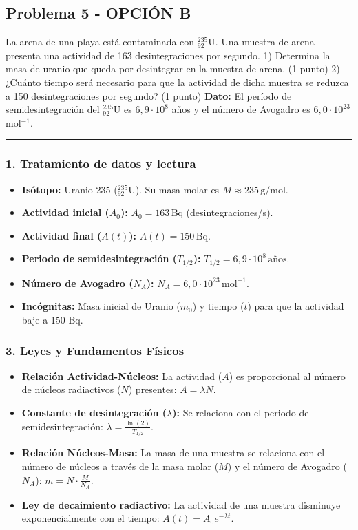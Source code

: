 \newpage

\subsection{Problema 5 - OPCIÓN B}
\label{subsec:5B_2009_sep_ext}

\begin{cajaenunciado}
La arena de una playa está contaminada con ${}_{92}^{235}\text{U}$. Una muestra de arena presenta una actividad de 163 desintegraciones por segundo.
1) Determina la masa de uranio que queda por desintegrar en la muestra de arena. (1 punto)
2) ¿Cuánto tiempo será necesario para que la actividad de dicha muestra se reduzca a 150 desintegraciones por segundo? (1 punto)
\textbf{Dato:} El período de semidesintegración del ${}_{92}^{235}\text{U}$ es $6,9\cdot10^8$ años y el número de Avogadro es $6,0\cdot10^{23}$ mol$^{-1}$.
\end{cajaenunciado}
\hrule

\subsubsection*{1. Tratamiento de datos y lectura}
\begin{itemize}
    \item \textbf{Isótopo:} Uranio-235 (${}^{235}_{92}\text{U}$). Su masa molar es $M \approx 235 \, \text{g/mol}$.
    \item \textbf{Actividad inicial ($A_0$):} $A_0 = 163 \, \text{Bq}$ (desintegraciones/s).
    \item \textbf{Actividad final ($A(t)$):} $A(t) = 150 \, \text{Bq}$.
    \item \textbf{Periodo de semidesintegración ($T_{1/2}$):} $T_{1/2} = 6,9 \cdot 10^8 \, \text{años}$.
    \item \textbf{Número de Avogadro ($N_A$):} $N_A = 6,0 \cdot 10^{23} \, \text{mol}^{-1}$.
    \item \textbf{Incógnitas:} Masa inicial de Uranio ($m_0$) y tiempo ($t$) para que la actividad baje a 150 Bq.
\end{itemize}

\subsubsection*{3. Leyes y Fundamentos Físicos}
\begin{itemize}
    \item \textbf{Relación Actividad-Núcleos:} La actividad ($A$) es proporcional al número de núcleos radiactivos ($N$) presentes: $A = \lambda N$.
    \item \textbf{Constante de desintegración ($\lambda$):} Se relaciona con el periodo de semidesintegración: $\lambda = \frac{\ln(2)}{T_{1/2}}$.
    \item \textbf{Relación Núcleos-Masa:} La masa de una muestra se relaciona con el número de núcleos a través de la masa molar ($M$) y el número de Avogadro ($N_A$): $m = N \cdot \frac{M}{N_A}$.
    \item \textbf{Ley de decaimiento radiactivo:} La actividad de una muestra disminuye exponencialmente con el tiempo: $A(t) = A_0 e^{-\lambda t}$.
\end{itemize}


